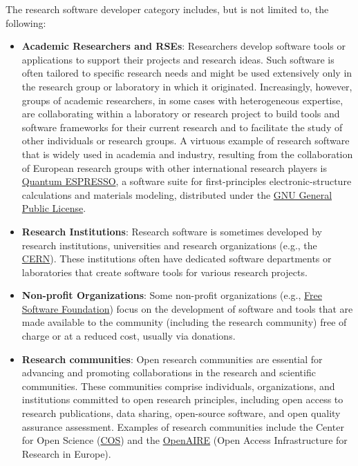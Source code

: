 The research software developer category includes, but is not limited to, the following: 
\begin{itemize}
\item \textbf{Academic Researchers and RSEs}: Researchers develop software tools or applications to support their projects and research ideas. Such software is often tailored to specific research needs and might be used extensively only in the research group or laboratory in which it originated. Increasingly, however, groups of academic researchers, in some cases with heterogeneous expertise, are collaborating within a laboratory or research project to build tools and software frameworks for their current research and to facilitate the study of other individuals or research groups. A virtuous example of research software that is widely used in academia and industry, resulting from the collaboration of European research groups with other international research players is \href{https://foundation.quantum-espresso.org/}{Quantum ESPRESSO}, a software suite for first-principles electronic-structure calculations and materials modeling, distributed under the \href{https://www.gnu.org/licenses/}{GNU General Public License}.

\item \textbf{Research Institutions}: Research software is sometimes developed by research institutions, universities and research organizations (e.g., the \href{https://home.web.cern.ch/}{CERN}). These institutions often have dedicated software departments or laboratories that create software tools for various research projects.

\item \textbf{Non-profit Organizations}: Some non-profit organizations (e.g., \href{https://www.fsf.org/}{Free Software Foundation}) focus on the development of software and tools that are made available to the community (including the research community) free of charge or at a reduced cost, usually via donations.

\item \textbf{Research communities}: Open research communities are essential for advancing and promoting collaborations in the research and scientific communities. These communities comprise individuals, organizations, and institutions committed to open research principles, including open access to research publications, data sharing, open-source software, and open quality assurance assessment. Examples of research communities include the Center for Open Science (\href{https://www.cos.io/}{COS}) and the \href{https://www.openaire.eu/}{OpenAIRE} (Open Access Infrastructure for Research in Europe).
\end{itemize}

